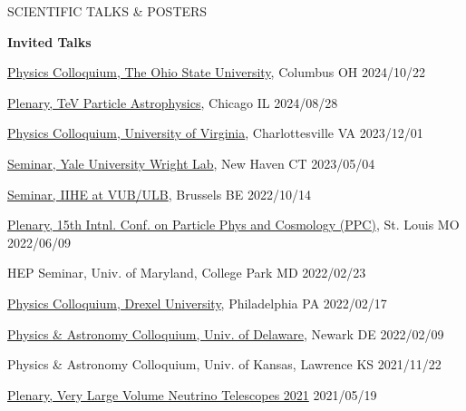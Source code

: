 \documentclass{resume} %
\begin{document}
\begin{rSection}{SCIENTIFIC TALKS \& POSTERS}

{\bf Invited Talks}
\begin{etaremune}

\item \href{https://physics.osu.edu/events/colloquium-brian-clark-university-maryland-chasing-ghost-particle-neutrino-astrophysics}{Physics Colloquium, The Ohio State University}, Columbus OH  \hfill 2024/10/22

\item \href{https://indico.uchicago.edu/event/427/contributions/1531/}{Plenary, TeV Particle Astrophysics}, Chicago IL  \hfill 2024/08/28

\item \href{https://www.phys.virginia.edu/Announcements/talk-list.asp?PERIOD=SID:4440}{Physics Colloquium, University of Virginia}, Charlottesville VA  \hfill 2023/12/01

\item \href{https://physics.yale.edu/event/npa-seminar-brian-clark-umd-college-park-chasing-ghost-particle-neutrino-astrophysics-south}{Seminar, Yale University Wright Lab}, New Haven CT  \hfill 2023/05/04

\item \href{https://indico.iihe.ac.be/event/1620/}{Seminar, IIHE at VUB/ULB}, Brussels BE  \hfill 2022/10/14

\item \href{https://indico.cern.ch/event/1126527/contributions/4818939/}{Plenary, 15th Intnl. Conf. on Particle Phys and Cosmology (PPC)}, St. Louis MO  \hfill 2022/06/09

\item HEP Seminar, Univ. of Maryland, College Park MD \hfill 2022/02/23

\item \href{https://drexel.edu/coas/news-events/events-calendar/details/?eid=35304&iid=93965}{Physics Colloquium, Drexel University}, Philadelphia PA  \hfill 2022/02/17

\item \href{https://web.physics.udel.edu/events/colloquium/colloquium-brian-clark}{Physics \& Astronomy Colloquium, Univ. of Delaware}, Newark DE \hfill 2022/02/09

\item Physics \& Astronomy Colloquium, Univ. of Kansas, Lawrence KS \hfill 2021/11/22

\item \href{https://indico.ific.uv.es/event/3965/contributions/14963/}{Plenary, Very Large Volume Neutrino Telescopes 2021} \hfill 2021/05/19


\end{etaremune}
\end{rSection}
\end{document}
